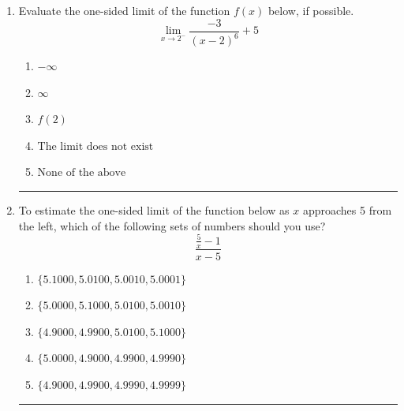 \documentclass[14pt]{extbook}
\newcommand{\litem}[1]{\item#1\hspace*{-1cm}\rule{\textwidth}{0.4pt}}
\begin{document}
\begin{enumerate}
{\begin{enumerate}[label=\Alph*.]
\end{enumerate} }
\litem{
Evaluate the one-sided limit of the function $f(x)$ below, if possible.\[ \lim_{x \rightarrow 2^-} \frac{-3}{(x-2)^6}+5 \]\begin{enumerate}[label=\Alph*.]
\item \( -\infty \)
\item \( \infty \)
\item \( f(2) \)
\item \( \text{The limit does not exist} \)
\item \( \text{None of the above} \)

\end{enumerate} }
\litem{
To estimate the one-sided limit of the function below as $x$ approaches 5 from the left, which of the following sets of numbers should you use?\[ \frac{\frac{5}{x} - 1}{x - 5} \]\begin{enumerate}[label=\Alph*.]
\item \( \{ 5.1000, 5.0100, 5.0010, 5.0001 \} \)
\item \( \{ 5.0000, 5.1000, 5.0100, 5.0010 \} \)
\item \( \{ 4.9000, 4.9900, 5.0100, 5.1000 \} \)
\item \( \{ 5.0000, 4.9000, 4.9900, 4.9990 \} \)
\item \( \{ 4.9000, 4.9900, 4.9990, 4.9999 \} \)

\end{enumerate} }
\end{enumerate}
\end{document}
